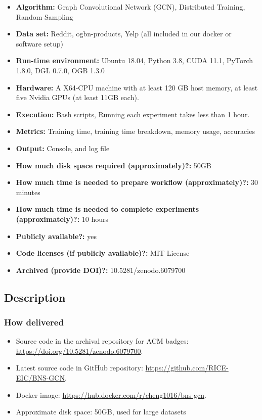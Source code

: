 \documentclass{article}
\begin{document}
{\small
\begin{itemize}
  \item {\bf Algorithm: }Graph Convolutional Network (GCN), Distributed Training, Random Sampling
  \item {\bf Data set: }Reddit, ogbn-products, Yelp (all included in our docker or software setup)
  \item {\bf Run-time environment: }Ubuntu 18.04, Python 3.8, CUDA 11.1, PyTorch 1.8.0, DGL 0.7.0, OGB 1.3.0
  \item {\bf Hardware: }A X64-CPU machine with at least 120 GB host memory, at least five Nvidia GPUs (at least 11GB each).
  \item {\bf Execution: }Bash scripts, Running each experiment takes less than 1 hour.
  \item {\bf Metrics: }Training time, training time breakdown, memory usage, accuracies
  \item {\bf Output: }Console, and log file
  \item {\bf How much disk space required (approximately)?: } 50GB
  \item {\bf How much time is needed to prepare workflow (approximately)?: }30 minutes
  \item {\bf How much time is needed to complete experiments (approximately)?: }10 hours
  \item {\bf Publicly available?: }yes
  \item {\bf Code licenses (if publicly available)?: } MIT License
  \item {\bf Archived (provide DOI)?: } 10.5281/zenodo.6079700
\end{itemize}
}
\subsection{Description}

\subsubsection{How delivered}
\begin{itemize}
    \item Source code in the archival repository for ACM badges: \href{https://doi.org/10.5281/zenodo.6079700}{https://doi.org/10.5281/zenodo.6079700}.
    \item Latest source code in GitHub repository: \href{https://github.com/RICE-EIC/BNS-GCN}{https://github.com/RICE-EIC/BNS-GCN}.
    \item Docker image: \href{https://hub.docker.com/r/cheng1016/bns-gcn}{https://hub.docker.com/r/cheng1016/bns-gcn}.
    \item Approximate disk space: 50GB, used for large datasets
\end{itemize}
\end{document}
